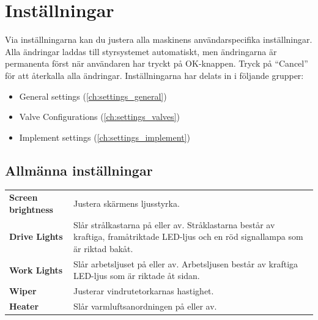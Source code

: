 \documentclass[12pt,a4paper,finnish]{uvmanual}
\begin{document}
\chapter{Inställningar}\label{ch:settings}

Via inställningarna kan du justera alla maskinens användarspecifika inställningar. Alla ändringar laddas till styrsystemet automatiskt, men ändringarna är permanenta först när användaren har tryckt på OK-knappen. Tryck på ``Cancel'' för att återkalla alla ändringar. Inställningarna har delats in i följande grupper:

\begin{itemize}
 \item General settings (\autoref{ch:settings_general})
 \item Valve Configurations (\autoref{ch:settings_valves})
 \item Implement settings (\autoref{ch:settings_implement})
\end{itemize}



\section{Allmänna inställningar}\label{ch:settings_general}



\begin{tabular}{ L{0.2\textwidth} L{0.66\textwidth} }
\textbf{Screen brightness} & Justera skärmens ljusstyrka.\\
\textbf{Drive Lights} & Slår strålkastarna på eller av. Stråklastarna består av kraftiga, framåtriktade LED-ljus och en röd signallampa som är riktad bakåt.  \\
\textbf{Work Lights} & Slår arbetsljuset på eller av. Arbetsljusen består av kraftiga LED-ljus som är riktade åt sidan.  \\
\textbf{Wiper} & Justerar vindrutetorkarnas hastighet. \\
\textbf{Heater} & Slår varmluftsanordningen på eller av. \\
\end{tabular}
\end{document}
